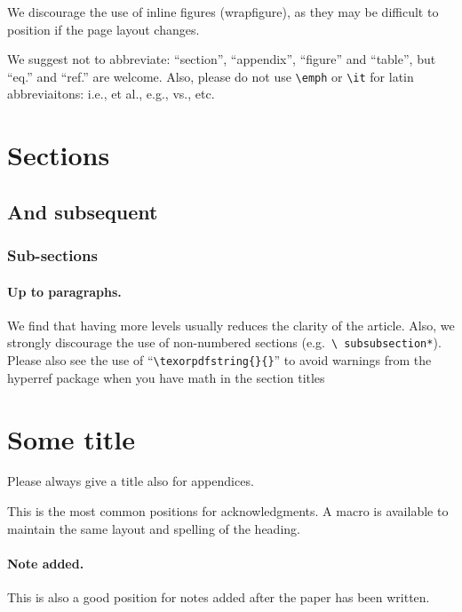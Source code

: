 \documentclass[letterpaper,12pt]{article}
\begin{document}
We discourage the use of inline figures (wrapfigure), as they may be
difficult to position if the page layout changes.

We suggest not to abbreviate: ``section'', ``appendix'', ``figure''
and ``table'', but ``eq.'' and ``ref.'' are welcome. Also, please do
not use \texttt{\textbackslash emph} or \texttt{\textbackslash it} for
latin abbreviaitons: i.e., et al., e.g., vs., etc.



\section{Sections}
\subsection{And subsequent}
\subsubsection{Sub-sections}
\paragraph{Up to paragraphs.} We find that having more levels usually
reduces the clarity of the article. Also, we strongly discourage the
use of non-numbered sections (e.g.~\texttt{\textbackslash
  subsubsection*}).  Please also see the use of
``\texttt{\textbackslash texorpdfstring\{\}\{\}}'' to avoid warnings
from the hyperref package when you have math in the section titles



\appendix
\section{Some title}
Please always give a title also for appendices.





\acknowledgments

This is the most common positions for acknowledgments. A macro is
available to maintain the same layout and spelling of the heading.

\paragraph{Note added.} This is also a good position for notes added
after the paper has been written.


\end{document}

